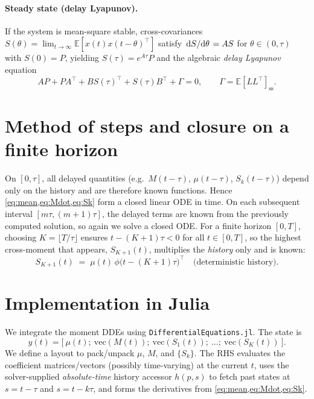 \documentclass[11pt]{article}
\begin{document}
\paragraph{Steady state (delay Lyapunov).}
If the system is mean-square stable, cross-covariances $S(\theta)=\lim_{t\to\infty}\mathbb{E}[x(t)x(t-\theta)^\top]$ satisfy $\dv*{S}{\theta}=A S$ for $\theta\in(0,\tau)$ with $S(0)=P$, yielding $S(\tau)=e^{A\tau}P$ and the algebraic \emph{delay Lyapunov} equation
\begin{equation}
  A P + P A^\top + B S(\tau)^\top + S(\tau) B^\top + \Gamma = 0,\qquad \Gamma=\mathbb{E}[L L^\top]_{\text{ss}}.
\end{equation}

\section{Method of steps and closure on a finite horizon}
On $[0,\tau]$, all delayed quantities (e.g.\ $M(t-\tau)$, $\mu(t-\tau)$, $S_k(t-\tau)$) depend only on the history and are therefore known functions. Hence \eqref{eq:mean,eq:Mdot,eq:Sk} form a closed linear ODE in time. On each subsequent interval $[m\tau,(m+1)\tau]$, the delayed terms are known from the previously computed solution, so again we solve a closed ODE. For a finite horizon $[0,T]$, choosing $K=\lfloor T/\tau\rfloor$ ensures $t-(K+1)\tau<0$ for all $t\in[0,T]$, so the highest cross-moment that appears, $S_{K+1}(t)$, multiplies the \emph{history} only and is known:
\begin{equation}
  S_{K+1}(t) \;=\; \mu(t)\,\phi\!\big(t-(K+1)\tau\big)^\top \quad\text{(deterministic history)}.
\end{equation}

\section{Implementation in Julia}
We integrate the moment DDEs using \texttt{DifferentialEquations.jl}. The state is
\begin{equation*}
  y(t) = \big[\ \mu(t);\ \mathrm{vec}(M(t));\ \mathrm{vec}(S_1(t));\ \dots;\ \mathrm{vec}(S_K(t))\ \big].
\end{equation*}
We define a layout to pack/unpack $\mu$, $M$, and $\{S_k\}$. The RHS evaluates the coefficient matrices/vectors (possibly time-varying) at the current $t$, uses the solver-supplied \emph{absolute-time} history accessor $h(p,s)$ to fetch past states at $s=t-\tau$ and $s=t-k\tau$, and forms the derivatives from \eqref{eq:mean,eq:Mdot,eq:Sk}.
\end{document}
